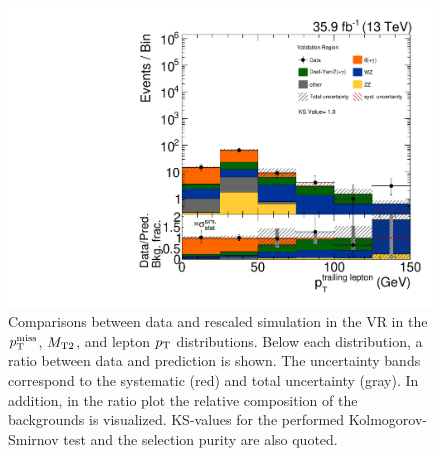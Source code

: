 \begin{figure}[tbp]
 \includegraphics[width=\pairwidth]{figures/plots_VR/VR_LL_pt2_log}
 \caption{Comparisons between data and rescaled simulation in the VR in the $p_{\mathrm{T}}^\text{miss}$, $M_{\mathrm{T2}}$, and lepton $p_{\mathrm{T}}$ distributions. Below each distribution, a ratio between data and prediction is shown. The uncertainty bands correspond to the systematic (red) and total uncertainty (gray). In addition, in the ratio plot the relative composition of the backgrounds is visualized. KS-values for the performed Kolmogorov-Smirnov test and the selection purity are also quoted.}
 \label{fig:VR1}
\end{figure}


